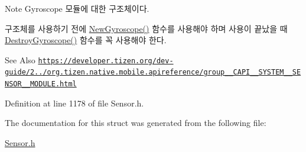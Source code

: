 \begin{DoxyNote}{Note}
Gyroscope 모듈에 대한 구조체이다. \par
 구조체를 사용하기 전에 \hyperlink{Sensor_8h_aad893caaae4e3153286926b76443bcf2}{New\-Gyroscope()} 함수를 사용해야 하며 사용이 끝났을 때 \hyperlink{Sensor_8h_a33c4827cef482ac97b726c6afd4f2c02}{Destroy\-Gyroscope()} 함수를 꼭 사용해야 한다. 
\end{DoxyNote}
\begin{DoxySeeAlso}{See Also}
\href{https://developer.tizen.org/dev-guide/2.3.0/org.tizen.native.mobile.apireference/group__CAPI__SYSTEM__SENSOR__MODULE.html}{\tt https\-://developer.\-tizen.\-org/dev-\/guide/2../org.\-tizen.\-native.\-mobile.\-apireference/group\-\_\-\-\_\-\-C\-A\-P\-I\-\_\-\-\_\-\-S\-Y\-S\-T\-E\-M\-\_\-\-\_\-\-S\-E\-N\-S\-O\-R\-\_\-\-\_\-\-M\-O\-D\-U\-L\-E.\-html} 
\end{DoxySeeAlso}


Definition at line 1178 of file Sensor.\-h.



The documentation for this struct was generated from the following file\-:\begin{DoxyCompactItemize}
\item 
\hyperlink{Sensor_8h}{Sensor.\-h}\end{DoxyCompactItemize}
